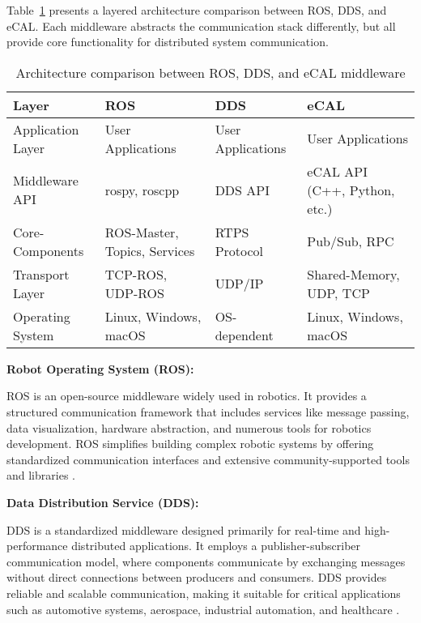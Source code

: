 \vspace{1em}
Table~\ref{tab:middleware_comparison} presents a layered architecture comparison between ROS, DDS, and eCAL. Each middleware abstracts the communication stack differently, but all provide core functionality for distributed system communication.

\begin{table}[H]
	\centering
	\renewcommand{\arraystretch}{1.20}
	\begin{tabular}{|p{2.25cm}|p{3.22cm}|p{3.22cm}|p{3.22cm}|}
		\hline
		\textbf{Layer} & \textbf{ROS} & \textbf{DDS} & \textbf{eCAL} \\
		\hline
		Application Layer & User Applications & User Applications & User Applications \\
		\hline
		Middleware API & rospy, roscpp & DDS API & eCAL API (C++, Python, etc.) \\
		\hline
		Core-Components & ROS-Master, Topics, Services & RTPS Protocol & Pub/Sub, RPC \\
		\hline
		Transport Layer & TCP-ROS, UDP-ROS & UDP/IP & Shared-Memory, UDP, TCP \\
		\hline
		Operating System & Linux, Windows, macOS & OS-dependent & Linux, Windows, macOS \\
		\hline
	\end{tabular}
	\caption{Architecture comparison between ROS, DDS, and eCAL middleware}
	\label{tab:middleware_comparison}
\end{table}

\vspace{1em}
\textbf{Robot Operating System (ROS):}
\vspace{0.4em}

ROS is an open-source middleware widely used in robotics. It provides a structured communication framework that includes services like message passing, data visualization, hardware abstraction, and numerous tools for robotics development. ROS simplifies building complex robotic systems by offering standardized communication interfaces and extensive community-supported tools and libraries \cite{quigley2009}.

\vspace{1em}
\textbf{Data Distribution Service (DDS):}
\vspace{0.4em}

DDS is a standardized middleware designed primarily for real-time and high-performance distributed applications. It employs a publisher-subscriber communication model, where components communicate by exchanging messages without direct connections between producers and consumers. DDS provides reliable and scalable communication, making it suitable for critical applications such as automotive systems, aerospace, industrial automation, and healthcare \cite{pardo2003}.

